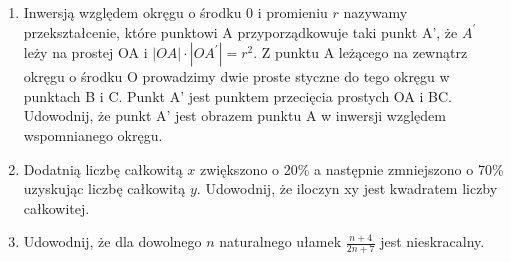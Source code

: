\documentclass[10pt]{article}
\begin{document}
\begin{enumerate}
  \item Inwersją względem okręgu o środku 0 i promieniu \(r\) nazywamy przekształcenie, które punktowi A przyporządkowuje taki punkt A', że \(A^{\prime}\) leży na prostej OA i \(|O A| \cdot\left|O A^{\prime}\right|=r^{2}\). Z punktu A leżącego na zewnątrz okręgu o środku O prowadzimy dwie proste styczne do tego okręgu w punktach B i C. Punkt A' jest punktem przecięcia prostych OA i BC. Udowodnij, że punkt A' jest obrazem punktu A w inwersji względem wspomnianego okręgu.
  \item Dodatnią liczbę całkowitą \(x\) zwiększono o 20\% a następnie zmniejszono o 70\% uzyskując liczbę całkowitą \(y\). Udowodnij, że iloczyn xy jest kwadratem liczby całkowitej.
  \item Udowodnij, że dla dowolnego \(n\) naturalnego ułamek \(\frac{n+4}{2 n+7}\) jest nieskracalny.
\end{enumerate}
\end{document}
